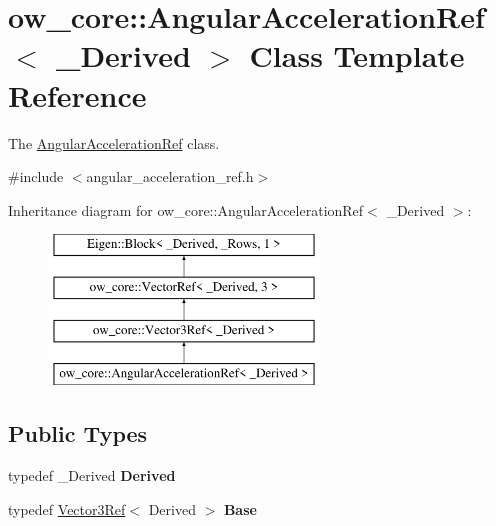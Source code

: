 \hypertarget{classow__core_1_1AngularAccelerationRef}{}\section{ow\+\_\+core\+:\+:Angular\+Acceleration\+Ref$<$ \+\_\+\+Derived $>$ Class Template Reference}
\label{classow__core_1_1AngularAccelerationRef}


The \hyperlink{classow__core_1_1AngularAccelerationRef}{Angular\+Acceleration\+Ref} class.  




{\ttfamily \#include $<$angular\+\_\+acceleration\+\_\+ref.\+h$>$}

Inheritance diagram for ow\+\_\+core\+:\+:Angular\+Acceleration\+Ref$<$ \+\_\+\+Derived $>$\+:\begin{figure}[H]
\begin{center}
\leavevmode
\includegraphics[height=4.000000cm]{d6/d6c/classow__core_1_1AngularAccelerationRef}
\end{center}
\end{figure}
\subsection*{Public Types}
\begin{DoxyCompactItemize}
\item 
typedef \+\_\+\+Derived {\bfseries Derived}\hypertarget{classow__core_1_1AngularAccelerationRef_afa1a59d3353ae26c4b217c5910c3b774}{}\label{classow__core_1_1AngularAccelerationRef_afa1a59d3353ae26c4b217c5910c3b774}

\item 
typedef \hyperlink{classow__core_1_1Vector3Ref}{Vector3\+Ref}$<$ Derived $>$ {\bfseries Base}\hypertarget{classow__core_1_1AngularAccelerationRef_a0019a8fd1b3bb570ae1a6f36b7466558}{}\label{classow__core_1_1AngularAccelerationRef_a0019a8fd1b3bb570ae1a6f36b7466558}

\end{DoxyCompactItemize}
